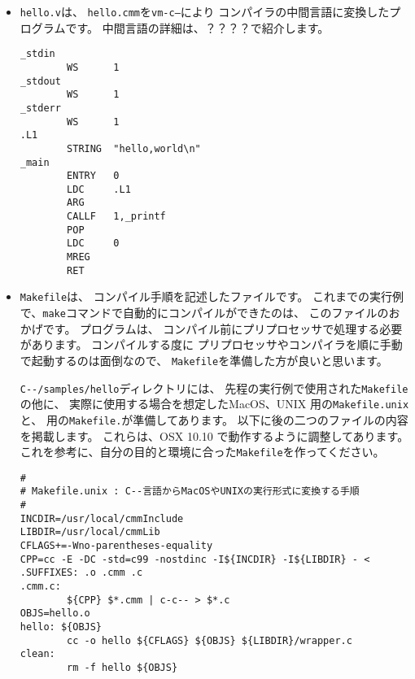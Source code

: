 \begin{itemize}
\begin{mylist}
\begin{verbatim}
_stdin  WS      1
_stdout WS      1
_stderr WS      1
.L1     STRING  "hello,world\n"
_main   PUSH    FP
        LD      FP,SP
        CALL    __stkChk
        LD      G0,#.L1
        PUSH    G0
        CALL    _printf
        ADD     SP,#2
        LD      G0,#0
        POP     FP
        RET
\end{verbatim}
\end{mylist}

\item {\tt hello.v}は、
\verb/hello.cmm/を{\tt vm-c--}により\cmm
コンパイラの中間言語に変換したプログラムです。
中間言語の詳細は、？？？？で紹介します。

\begin{mylist}
\begin{verbatim}
_stdin
        WS      1
_stdout
        WS      1
_stderr
        WS      1
.L1
        STRING  "hello,world\n"
_main
        ENTRY   0
        LDC     .L1
        ARG
        CALLF   1,_printf
        POP
        LDC     0
        MREG
        RET
\end{verbatim}
\end{mylist}

\item {\tt Makefile}は、
コンパイル手順を記述したファイルです。
これまでの実行例で、{\tt make}コマンドで自動的にコンパイルができたのは、
このファイルのおかげです。
\cmm プログラムは、
コンパイル前にプリプロセッサで処理する必要があります。
コンパイルする度に
プリプロセッサやコンパイラを順に手動で起動するのは面倒なので、
{\tt Makefile}を準備した方が良いと思います。

\verb;C--/samples/hello;ディレクトリには、
先程の実行例で使用された{\tt Makefile}の他に、
実際に使用する場合を想定したMacOS、UNIX 用の{\tt Makefile.unix}と、
\tacos 用の{\tt Makefile.}が準備してあります。
以下に後の二つのファイルの内容を掲載します。
これらは、OSX 10.10 で動作するように調整してあります。
これを参考に、自分の目的と環境に合った{\tt Makefile}を作ってください。

\begin{mylist}
\begin{verbatim}
#
# Makefile.unix : C--言語からMacOSやUNIXの実行形式に変換する手順
#
INCDIR=/usr/local/cmmInclude
LIBDIR=/usr/local/cmmLib
CFLAGS+=-Wno-parentheses-equality
CPP=cc -E -DC -std=c99 -nostdinc -I${INCDIR} -I${LIBDIR} - < 
.SUFFIXES: .o .cmm .c
.cmm.c:
        ${CPP} $*.cmm | c-c-- > $*.c
OBJS=hello.o
hello: ${OBJS}
        cc -o hello ${CFLAGS} ${OBJS} ${LIBDIR}/wrapper.c
clean:
        rm -f hello ${OBJS}
\end{verbatim}
\end{mylist}


\end{itemize}
